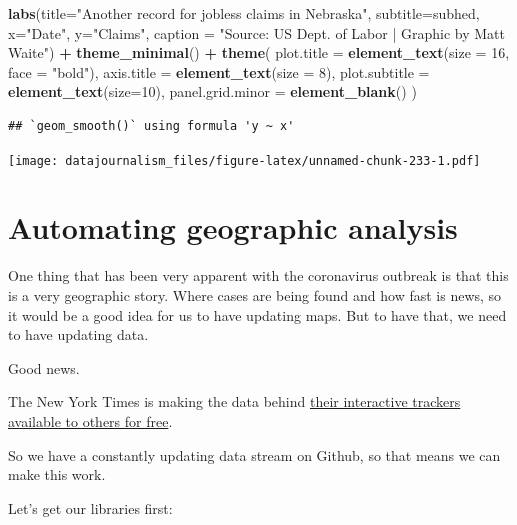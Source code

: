 \documentclass[]{book}
\newenvironment{Shaded}{\begin{snugshade}}{\end{snugshade}}
\newcommand{\DataTypeTok}[1]{\textcolor[rgb]{0.13,0.29,0.53}{#1}}
\newcommand{\DecValTok}[1]{\textcolor[rgb]{0.00,0.00,0.81}{#1}}
\newcommand{\KeywordTok}[1]{\textcolor[rgb]{0.13,0.29,0.53}{\textbf{#1}}}
\newcommand{\NormalTok}[1]{#1}
\newcommand{\OperatorTok}[1]{\textcolor[rgb]{0.81,0.36,0.00}{\textbf{#1}}}
\newcommand{\StringTok}[1]{\textcolor[rgb]{0.31,0.60,0.02}{#1}}
\begin{document}
\begin{Shaded}
\begin{Highlighting}[]
\StringTok{  }\KeywordTok{labs}\NormalTok{(}\DataTypeTok{title=}\StringTok{"Another record for jobless claims in Nebraska"}\NormalTok{, }\DataTypeTok{subtitle=}\NormalTok{subhed, }\DataTypeTok{x=}\StringTok{"Date"}\NormalTok{, }\DataTypeTok{y=}\StringTok{"Claims"}\NormalTok{, }\DataTypeTok{caption =} \StringTok{"Source: US Dept. of Labor  |  Graphic by Matt Waite"}\NormalTok{) }\OperatorTok{+}
\StringTok{  }\KeywordTok{theme_minimal}\NormalTok{() }\OperatorTok{+}\StringTok{ }
\StringTok{  }\KeywordTok{theme}\NormalTok{(}
    \DataTypeTok{plot.title =} \KeywordTok{element_text}\NormalTok{(}\DataTypeTok{size =} \DecValTok{16}\NormalTok{, }\DataTypeTok{face =} \StringTok{"bold"}\NormalTok{),}
    \DataTypeTok{axis.title =} \KeywordTok{element_text}\NormalTok{(}\DataTypeTok{size =} \DecValTok{8}\NormalTok{), }
    \DataTypeTok{plot.subtitle =} \KeywordTok{element_text}\NormalTok{(}\DataTypeTok{size=}\DecValTok{10}\NormalTok{), }
    \DataTypeTok{panel.grid.minor =} \KeywordTok{element_blank}\NormalTok{()}
\NormalTok{    )}
\end{Highlighting}
\end{Shaded}

\begin{verbatim}
## `geom_smooth()` using formula 'y ~ x'
\end{verbatim}

\texttt{[image: datajournalism\_files/figure-latex/unnamed-chunk-233-1.pdf]}

\hypertarget{automating-geographic-analysis}{%
\chapter{Automating geographic analysis}\label{automating-geographic-analysis}}

One thing that has been very apparent with the coronavirus outbreak is that this is a very geographic story. Where cases are being found and how fast is news, so it would be a good idea for us to have updating maps. But to have that, we need to have updating data.

Good news.

The New York Times is making the data behind \href{https://www.nytimes.com/interactive/2020/us/coronavirus-us-cases.html}{their interactive trackers} \href{https://github.com/nytimes/covid-19-data}{available to others for free}.

So we have a constantly updating data stream on Github, so that means we can make this work.

Let's get our libraries first:
\end{document}
